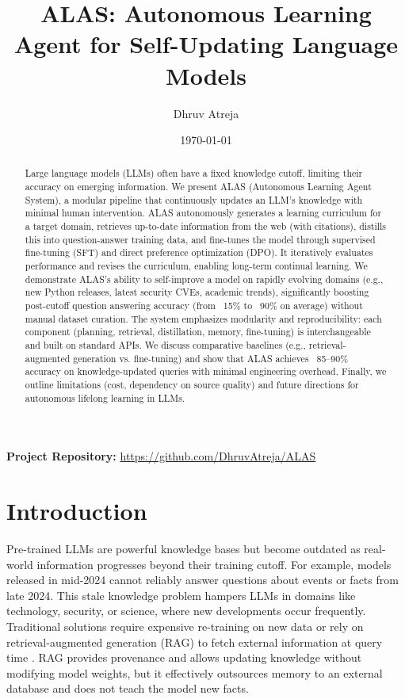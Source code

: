 \documentclass[11pt]{article}
\title{ALAS: Autonomous Learning Agent for Self-Updating Language Models}
\author{Dhruv Atreja}
\date{\today}
\begin{document}
\maketitle

\begin{center}
\textbf{Project Repository:} \url{https://github.com/DhruvAtreja/ALAS}
\end{center}

\begin{abstract}
Large language models (LLMs) often have a fixed knowledge cutoff, limiting their accuracy on emerging information. We present ALAS (Autonomous Learning Agent System), a modular pipeline that continuously updates an LLM’s knowledge with minimal human intervention. ALAS autonomously generates a learning curriculum for a target domain, retrieves up-to-date information from the web (with citations), distills this into question-answer training data, and fine-tunes the model through supervised fine-tuning (SFT) and direct preference optimization (DPO). It iteratively evaluates performance and revises the curriculum, enabling long-term continual learning. We demonstrate ALAS’s ability to self-improve a model on rapidly evolving domains (e.g., new Python releases, latest security CVEs, academic trends), significantly boosting post-cutoff question answering accuracy (from ~15\% to ~90\% on average) without manual dataset curation. The system emphasizes modularity and reproducibility: each component (planning, retrieval, distillation, memory, fine-tuning) is interchangeable and built on standard APIs. We discuss comparative baselines (e.g., retrieval-augmented generation vs. fine-tuning) and show that ALAS achieves ~85--90\% accuracy on knowledge-updated queries with minimal engineering overhead. Finally, we outline limitations (cost, dependency on source quality) and future directions for autonomous lifelong learning in LLMs.
\end{abstract}

\section{Introduction}
Pre-trained LLMs are powerful knowledge bases but become outdated as real-world information progresses beyond their training cutoff. For example, models released in mid-2024 cannot reliably answer questions about events or facts from late 2024. This stale knowledge problem hampers LLMs in domains like technology, security, or science, where new developments occur frequently. Traditional solutions require expensive re-training on new data or rely on retrieval-augmented generation (RAG) to fetch external information at query time \citep{lewis2020retrieval}. RAG provides provenance and allows updating knowledge without modifying model weights, but it effectively outsources memory to an external database and does not teach the model new facts.
\end{document}
